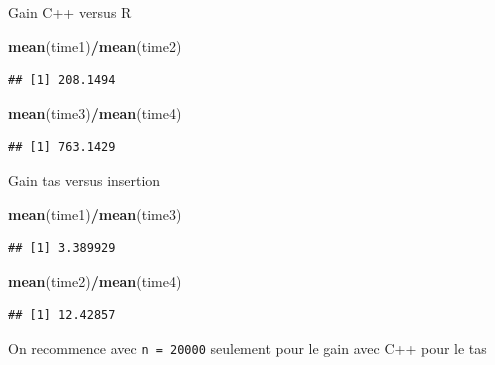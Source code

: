 \documentclass[
]{article}
\newenvironment{Shaded}{\begin{snugshade}}{\end{snugshade}}
\newcommand{\FunctionTok}[1]{\textcolor[rgb]{0.13,0.29,0.53}{\textbf{#1}}}
\newcommand{\NormalTok}[1]{#1}
\newcommand{\SpecialCharTok}[1]{\textcolor[rgb]{0.81,0.36,0.00}{\textbf{#1}}}
\begin{document}
Gain C++ versus R

\begin{Shaded}
\begin{Highlighting}[]
\FunctionTok{mean}\NormalTok{(time1)}\SpecialCharTok{/}\FunctionTok{mean}\NormalTok{(time2)}
\end{Highlighting}
\end{Shaded}

\begin{verbatim}
## [1] 208.1494
\end{verbatim}

\begin{Shaded}
\begin{Highlighting}[]
\FunctionTok{mean}\NormalTok{(time3)}\SpecialCharTok{/}\FunctionTok{mean}\NormalTok{(time4)}
\end{Highlighting}
\end{Shaded}

\begin{verbatim}
## [1] 763.1429
\end{verbatim}

Gain tas versus insertion

\begin{Shaded}
\begin{Highlighting}[]
\FunctionTok{mean}\NormalTok{(time1)}\SpecialCharTok{/}\FunctionTok{mean}\NormalTok{(time3)}
\end{Highlighting}
\end{Shaded}

\begin{verbatim}
## [1] 3.389929
\end{verbatim}

\begin{Shaded}
\begin{Highlighting}[]
\FunctionTok{mean}\NormalTok{(time2)}\SpecialCharTok{/}\FunctionTok{mean}\NormalTok{(time4)}
\end{Highlighting}
\end{Shaded}

\begin{verbatim}
## [1] 12.42857
\end{verbatim}

On recommence avec \texttt{n\ =\ 20000} seulement pour le gain avec C++
pour le tas
\end{document}

